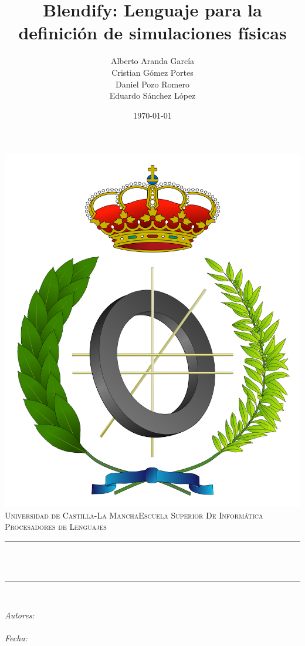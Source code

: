 \documentclass[12pt]{article}
\title{Blendify: Lenguaje para la definición de simulaciones físicas}												%
\author{Alberto Aranda García \\ Cristian Gómez Portes \\ Daniel Pozo Romero \\ Eduardo Sánchez López}				%
\date{\today}																										%
\makeatletter
\let\thetitle\@title
\let\theauthor\@author
\let\thedate\@date
\makeatother
\begin{document}

\begin{titlepage}
	\centering
    \vspace*{0.5 cm}
    \includegraphics[scale = 0.15]{informatica.png}\\[1.0 cm]														%
    \textsc{\LARGE Universidad de Castilla-La Mancha\newline\newline Escuela Superior De Informática}\\[2.0 cm]		%
	\textsc{\Large Procesadores de Lenguajes}\\[0.5 cm]																	%
	\rule{\linewidth}{0.2 mm} \\[0.4 cm]
	{ \huge \bfseries \thetitle}\\
	\rule{\linewidth}{0.2 mm} \\[1.5 cm]
	
	\begin{minipage}{0.4\textwidth}
		\begin{center} \large
			\emph{Autores:}\\
			\theauthor\\
			\vspace*{1 cm}
			\emph{Fecha:}\\
			\thedate\\
			\end{center}
        
	\end{minipage}\\[2 cm]
	
\end{titlepage}
\end{document}
